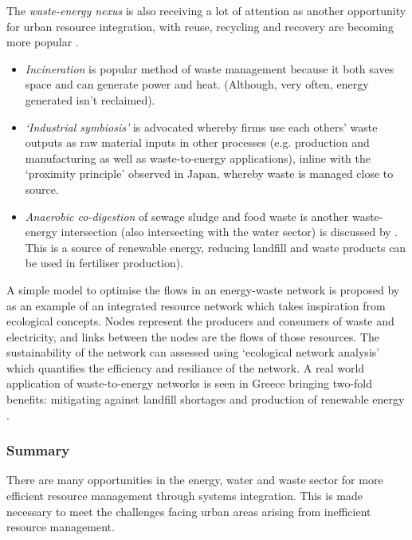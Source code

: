 The \emph{waste-energy nexus} is also receiving a lot of attention as another opportunity for urban resource integration, with reuse, recycling and recovery are becoming more popular \citep{Geng2010}. 
\begin{itemize} 
	\item \emph{Incineration} is popular method of waste management because it both saves space and can generate power and heat. (Although, very often, energy generated isn't reclaimed).  
	\item \emph{`Industrial symbiosis'} is advocated whereby firms use each others' waste outputs as raw material inputs in other processes (e.g. production and manufacturing as well as waste-to-energy applications), inline with the `proximity principle' observed in Japan, whereby waste is managed close to source. %
	\item \emph{Anaerobic co-digestion} of sewage sludge and food waste is another waste-energy intersection (also intersecting with the water sector) is discussed by \citet{Iacovidou2012}. This is a source of renewable energy, reducing landfill and waste products can be used in fertiliser production).
\end{itemize}
A simple model to optimise the flows in an energy-waste network is proposed by \citet{Kharrazi2012} as an example of an integrated resource network which takes inspiration from ecological concepts. Nodes represent the producers and consumers of waste and electricity, and links between the nodes are the flows of those resources. The sustainability of the network can assessed using `ecological network analysis' which quantifies the efficiency and resiliance of the network. A real world application of waste-to-energy networks is seen in Greece bringing two-fold benefits: mitigating against landfill shortages and production of renewable energy \citep{Xydis2012}.

\subsubsection*{Summary}
There are many opportunities in the energy, water and waste sector for more efficient resource management through systems integration. This is made necessary to meet the challenges facing urban areas arising from inefficient resource management.
%
%
